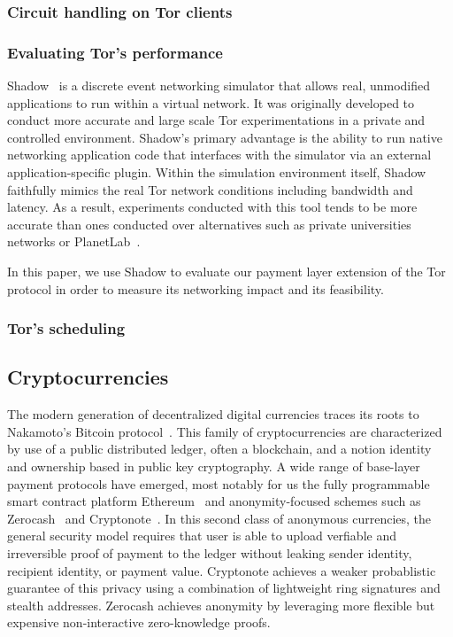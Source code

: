 \subsubsection{Circuit handling on Tor clients}

\subsubsection{Evaluating Tor's performance}
Shadow~\cite{shadow-ndss12} is a discrete event networking simulator that allows
real, unmodified applications to run within a virtual network. It was originally
developed to conduct more accurate and large scale Tor experimentations in a
private and controlled environment. Shadow's primary advantage is the ability to
run native networking application code that interfaces with the simulator via an
external application-specific plugin.   Within the simulation environment itself,
Shadow faithfully mimics the real Tor network conditions including bandwidth and
latency. As a result, experiments conducted with this tool tends to be more
accurate than ones conducted over alternatives such as private universities
networks or PlanetLab~\cite{Chun:2003:POT:956993.956995}.

In this paper, we use Shadow to evaluate our payment layer extension of the Tor
protocol in order to measure its networking impact and its feasibility.
\subsubsection{Tor's scheduling}


\subsection{Cryptocurrencies}

The modern generation of decentralized digital currencies traces its roots to
Nakamoto's Bitcoin protocol~\cite{nakamoto2008bitcoin}. This family of
cryptocurrencies are characterized by use of a public distributed ledger, often
a blockchain, and a notion identity and ownership based in public key
cryptography. A wide range of base-layer payment protocols have emerged, most
notably for us the fully programmable smart contract platform
Ethereum~\cite{wood2014ethereum} and anonymity-focused schemes such as
Zerocash~\cite{sasson2014zerocash} and Cryptonote~\cite{van2013cryptonote}. In
this second class of anonymous currencies, the general security model requires
that user is able to upload verfiable and irreversible proof of payment to the
ledger without leaking sender identity, recipient identity, or payment
value. Cryptonote achieves a weaker probablistic guarantee of this privacy using
a combination of lightweight ring signatures and stealth addresses. Zerocash
achieves anonymity by leveraging more flexible but expensive non-interactive
zero-knowledge proofs.

